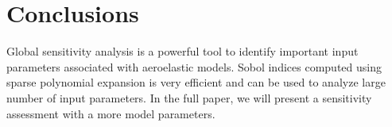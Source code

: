 \documentclass[11pt]{article}
\begin{document}
\section{Conclusions}
Global sensitivity analysis is a powerful tool to identify important input parameters associated with aeroelastic models. Sobol indices computed using sparse polynomial expansion is very efficient and can be used to analyze large number of input parameters. In the full paper, we will present a sensitivity assessment with a more model parameters.


\end{document}

